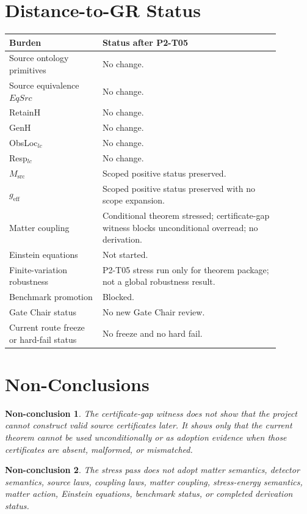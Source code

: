 \documentclass[11pt]{article}
\newcommand{\geff}{g_{\mathrm{eff}}}
\newtheorem{nonconclusion}{Non-conclusion}
\begin{document}
\section{Distance-to-GR Status}

\begin{longtable}{p{0.30\linewidth}p{0.58\linewidth}}
\toprule
Burden & Status after P2-T05 \\
\midrule
Source ontology primitives & No change. \\
Source equivalence \(EqSrc\) & No change. \\
RetainH & No change. \\
GenH & No change. \\
ObsLoc\(_{lc}\) & No change. \\
Resp\(_{lc}\) & No change. \\
\(M_{\mathrm{src}}\) & Scoped positive status preserved. \\
\(\geff\) & Scoped positive status preserved with no scope expansion. \\
Matter coupling & Conditional theorem stressed; certificate-gap witness blocks
unconditional overread; no derivation. \\
Einstein equations & Not started. \\
Finite-variation robustness & P2-T05 stress run only for theorem package;
not a global robustness result. \\
Benchmark promotion & Blocked. \\
Gate Chair status & No new Gate Chair review. \\
Current route freeze or hard-fail status & No freeze and no hard fail. \\
\bottomrule
\end{longtable}

\section{Non-Conclusions}

\begin{nonconclusion}
The certificate-gap witness does not show that the project cannot construct
valid source certificates later. It shows only that the current theorem cannot
be used unconditionally or as adoption evidence when those certificates are
absent, malformed, or mismatched.
\end{nonconclusion}

\begin{nonconclusion}
The stress pass does not adopt matter semantics, detector semantics, source
laws, coupling laws, matter coupling, stress-energy semantics, matter action,
Einstein equations, benchmark status, or completed derivation status.
\end{nonconclusion}
\end{document}
